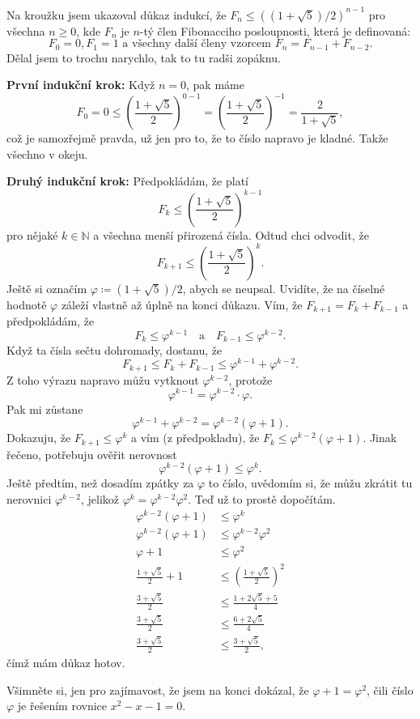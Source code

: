 \documentclass[a4paper,11pt]{article}
\newcommand{\N}{\mathbb{N}}
\begin{document}
Na kroužku jsem ukazoval důkaz indukcí, že $F_n \leq ((1+\sqrt{5}) / 2)^{n-1}$
pro všechna $n \geq 0$, kde $F_n$ je $n$-tý člen Fibonacciho posloupnosti, která
je definovaná:
\[
 F_0 = 0, F_1 = 1 \text{ a všechny další členy vzorcem } F_n = F_{n-1} +
 F_{n-2}.
\]
Dělal jsem to trochu narychlo, tak to tu radši zopáknu.

\textbf{První indukční krok:} Když $n = 0$, pak máme
\[
 F_0 = 0 \leq \left( \frac{1+\sqrt{5}}{2} \right) ^{0-1} = \left(
 \frac{1+\sqrt{5}}{2} \right) ^{-1} = \frac{2}{1+\sqrt{5}},
\]
což je samozřejmě pravda, už jen pro to, že to číslo napravo je kladné. Takže
všechno v okeju.

\textbf{Druhý indukční krok:} Předpokládám, že platí
\[
 F_k \leq \left( \frac{1+\sqrt{5}}{2} \right)^{k-1} 
\]
pro nějaké $k \in \N$ a všechna menší přirozená čísla. Odtud chci odvodit, že
\[
 F_{k+1} \leq \left( \frac{1+\sqrt{5}}{2} \right) ^{k}.
\]
Ještě si označím $\varphi \coloneqq (1+\sqrt{5}) / 2$, abych se neupsal.
Uvidíte, že na číselné hodnotě $\varphi$ záleží vlastně až úplně na konci
důkazu. Vím, že $F_{k+1} = F_k + F_{k-1}$ a předpokládám, že
\[
 F_k \leq \varphi^{k-1} \quad \text{a} \quad F_{k-1} \leq \varphi^{k-2}.
\]
Když ta čísla sečtu dohromady, dostanu, že
\[
 F_{k+1} \leq F_k + F_{k-1} \leq \varphi^{k-1} + \varphi^{k-2}.
\]
Z toho výrazu napravo můžu vytknout $\varphi^{k-2}$, protože
\[
 \varphi^{k-1} = \varphi^{k-2} \cdot \varphi.
\]
Pak mi zůstane
\[
 \varphi^{k-1} + \varphi^{k-2} = \varphi^{k-2}(\varphi + 1).
\]
Dokazuju, že $F_{k+1} \leq \varphi^k$ a vím (z předpokladu), že $F_k \leq
\varphi^{k-2}(\varphi + 1)$. Jinak řečeno, potřebuju ověřit nerovnost
\[
 \varphi^{k-2}(\varphi + 1) \leq \varphi^{k}.
\]
Ještě předtím, než dosadím zpátky za $\varphi$ to číslo, uvědomím si, že můžu
zkrátit tu nerovnici $\varphi^{k-2}$, jelikož $\varphi^{k} =
\varphi^{k-2}\varphi^{2}$. Teď už to prostě dopočítám.
\begin{align*}
 \varphi^{k-2}(\varphi + 1) & \leq \varphi^{k}\\
 \varphi^{k-2}(\varphi + 1) & \leq \varphi^{k-2}\varphi^{2}\\
 \varphi + 1 & \leq \varphi^2\\
 \frac{1+\sqrt{5}}{2} + 1 & \leq \left( \frac{1+\sqrt{5}}{2} \right)^2\\
 \frac{3+\sqrt{5}}{2} & \leq \frac{1 + 2\sqrt{5} + 5}{4}\\
 \frac{3+\sqrt{5}}{2} & \leq \frac{6+2\sqrt{5}}{4}\\
 \frac{3+\sqrt{5}}{2} & \leq \frac{3+\sqrt{5}}{2},
\end{align*}
čímž mám důkaz hotov.

Všimněte si, jen pro zajímavost, že jsem na konci dokázal, že $\varphi + 1 =
\varphi^2$, čili číslo $\varphi$ je řešením rovnice $x^2 - x - 1 = 0$.
\end{document}
